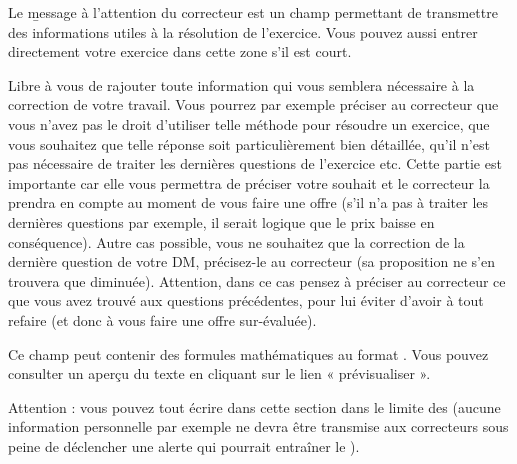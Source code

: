 Le \b{message à l'attention du correcteur} est un champ permettant de transmettre des informations utiles à la résolution de l'exercice.
Vous pouvez aussi entrer directement votre exercice dans cette zone s'il est court.

Libre à vous de rajouter toute information qui vous semblera nécessaire à la correction de votre travail. Vous pourrez par exemple préciser au correcteur que vous n'avez pas le droit d'utiliser telle méthode pour résoudre un exercice, que vous souhaitez que telle réponse soit particulièrement bien détaillée, qu'il n'est pas nécessaire de traiter les dernières questions de l'exercice etc. Cette partie est importante car elle vous permettra de préciser votre souhait et le correcteur la prendra en compte au moment de vous faire une offre (s'il n'a pas à traiter les dernières questions par exemple, il serait logique que le prix baisse en conséquence). Autre cas possible, vous ne souhaitez que la correction de la dernière question de votre DM, précisez-le au correcteur (sa proposition ne s'en trouvera que diminuée). Attention, dans ce cas pensez à préciser au correcteur ce que vous avez trouvé aux questions précédentes, pour lui éviter d'avoir à tout refaire (et donc à vous faire une offre sur-évaluée).

Ce champ peut contenir des formules mathématiques au format \doc[tex]{$\LaTeX$}. Vous pouvez consulter un aperçu du texte en cliquant sur le lien « prévisualiser ».

Attention : vous pouvez tout écrire dans cette section dans le limite des  (aucune information personnelle par exemple ne devra être transmise aux correcteurs sous peine de déclencher une alerte qui pourrait entraîner le ).